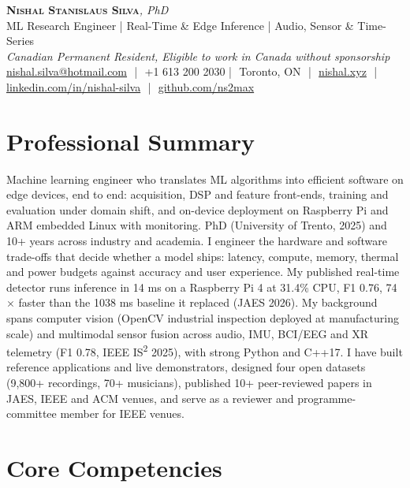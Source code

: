 \documentclass[11pt]{article}
\makeatletter
\newcommand{\cvName}{Nishal Stanislaus Silva}
\newcommand{\cvEmail}{nishal.silva@hotmail.com}
\newcommand{\cvPhone}{+1 613 200 2030}
\newcommand{\cvCity}{Toronto, ON}
\newcommand{\cvSite}{https://nishal.xyz}
\newcommand{\cvLinkedIn}{https://www.linkedin.com/in/nishal-silva}
\newcommand{\cvGitHub}{https://github.com/ns2max}
\newcommand{\cvStatus}{Canadian Permanent Resident, Eligible to work in Canada without sponsorship}
\newcommand{\cvTagline}{ML Research Engineer | Real-Time \& Edge Inference | Audio, Sensor \& Time-Series}
\makeatother
\begin{document}
\pagestyle{empty}
\begin{center}
    {\LARGE \scshape \textbf{\cvName}}{\large \textit{, PhD}}\\[1pt]
    {\small \cvTagline}\\[1pt]
    {\footnotesize\textit{\cvStatus}}\\[1pt]
    {\small
    \href{mailto:\cvEmail}{\cvEmail} \,\,|\,\, \cvPhone \,\,|\,\, \cvCity
    \,\,|\,\, \href{\cvSite}{nishal.xyz} \,\,|\,\, \href{\cvLinkedIn}{linkedin.com/in/nishal-silva}
    \,\,|\,\, \href{\cvGitHub}{github.com/ns2max}}
\end{center}

\section*{Professional Summary}

Machine learning engineer who translates ML algorithms into efficient software on edge devices, end to end: acquisition, DSP and feature front-ends, training and evaluation under domain shift, and on-device deployment on Raspberry Pi and ARM embedded Linux with monitoring. PhD (University of Trento, 2025) and 10+ years across industry and academia. I engineer the hardware and software trade-offs that decide whether a model ships: latency, compute, memory, thermal and power budgets against accuracy and user experience. My published real-time detector runs inference in 14 ms on a Raspberry Pi 4 at 31.4\% CPU, F1 0.76, 74$\times$ faster than the 1038 ms baseline it replaced (JAES 2026). My background spans computer vision (OpenCV industrial inspection deployed at manufacturing scale) and multimodal sensor fusion across audio, IMU, BCI/EEG and XR telemetry (F1 0.78, IEEE IS\textsuperscript{2} 2025), with strong Python and C++17. I have built reference applications and live demonstrators, designed four open datasets (9,800+ recordings, 70+ musicians), published 10+ peer-reviewed papers in JAES, IEEE and ACM venues, and serve as a reviewer and programme-committee member for IEEE venues.

\section*{Core Competencies}
\end{document}
